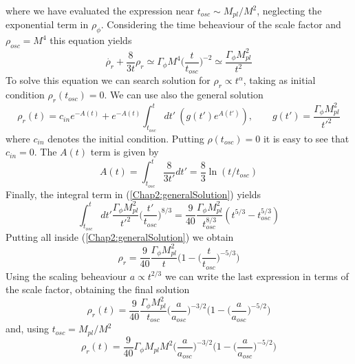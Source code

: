 \documentclass[11pt,a4paper,twoside]{book}
\begin{document}
where we have evaluated the expression near $ t_{osc} \sim M_{pl}/M^{2} $, neglecting the exponential term in $\rho_{\phi}$. Considering the time beheaviour of the scale factor  and $\rho_{osc}=M^{4}$ this equation yields
\begin{equation}
	\label{Chap2:radiation3}
		\dot{\rho_{r}} + \frac{8}{3t}\rho_{r} \simeq \Gamma_{\phi} M^{4} \Big (\frac{t}{t_{osc}}\Big)^{-2} \simeq \frac{\Gamma_{\phi} M_{pl}^{2}}{t^{2}}
\end{equation}
To solve this equation we can search solution for $ \rho_{r} \propto t^{\alpha} $, taking as initial condition $\rho_{r}(t_{osc})=0$. We can use also the general solution
\begin{equation}
	\label{Chap2:generalSolution}
	\rho_{r}(t)=c_{in}e^{-A(t)} + e^{-A(t)} \int_{t_{osc}}^{t}dt'\ (g(t')e^{A(t')}), \qquad 
	g(t') = \frac{\Gamma_{\phi} M_{pl}^{2}}{t'^{2}}  
\end{equation}
where $ c_{in} $ denotes the initial condition. Putting $ \rho(t_{osc})=0 $ it is easy to see that $ c_{in}=0 $. The $ A(t) $ term is given by
\begin{equation}
	\label{Chap2:A(t)2}
	A(t)=\int_{t_{osc}}^{t}\frac{8}{3t'}dt'=\frac{8}{3}\ln(t/t_{osc})
\end{equation}
Finally, the integral term in (\ref{Chap2:generalSolution}) yields
\begin{equation}
	\label{Chap2:IntegralTerm}
	\int_{t_{osc}}^{t} dt'\frac{\Gamma_{\phi} M_{pl}^{2}}{t'^{2}}\Big (\frac{t'}{t_{osc}}\Big)^{8/3} = \frac{9}{40}\frac{\Gamma_{\phi} M_{pl}^{2}}{t_{osc}^{8/3}}(t^{5/3} - t_{osc}^{5/3})
\end{equation}
Putting all inside (\ref{Chap2:generalSolution}) we obtain
\begin{equation}
	\rho_{r}=\frac{9}{40}\frac{\Gamma_{\phi}M_{pl}^{2}}{t}\Big (1- \Big (\frac{t}{t_{osc}}\Big)^{-5/3}\Big)
\end{equation}
Using the scaling beheaviour $ a \propto t^{2/3} $ we can write the last expression in terms of the scale factor, obtaining the final solution
\begin{equation}
\label{Chap2:finalSolution}
\rho_{r}(t)=\frac{9}{40}\frac{\Gamma_{\phi}M_{pl}^{2}}{t_{osc}}\Big (\frac{a}{a_{osc}}\Big)^{-3/2}\Big (1- \Big (\frac{a}{a_{osc}}\Big)^{-5/2}\Big)
\end{equation}
and, using $ t_{osc}=M_{pl}/M^{2} $
\begin{equation}
	\rho_{r}(t)=\frac{9}{40}\Gamma_{\phi}M_{pl}M^{2}\Big (\frac{a}{a_{osc}}\Big)^{-3/2}\Big (1- \Big (\frac{a}{a_{osc}}\Big)^{-5/2}\Big)
\end{equation}
\end{document}

